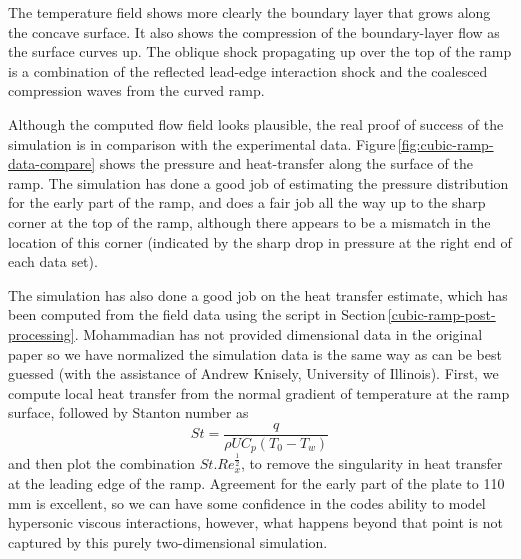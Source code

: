 \medskip
The temperature field shows more clearly the boundary layer that grows along the concave surface.
It also shows the compression of the boundary-layer flow as the surface curves up.
The oblique shock propagating up over the top of the ramp is a combination of the reflected lead-edge
interaction shock and the coalesced compression waves from the curved ramp.

\clearpage

\medskip
Although the computed flow field looks plausible,
the real proof of success of the simulation is in comparison with the experimental data.
Figure\,\ref{fig:cubic-ramp-data-compare} shows the pressure and heat-transfer
along the surface of the ramp.
The simulation has done a good job of estimating the pressure distribution for the early part of the ramp,
and does a fair job all the way up to the sharp corner at the top of the ramp,
although there appears to be a mismatch in the location of this corner 
(indicated by the sharp drop in pressure at the right end of each data set).

\medskip
The simulation has also done a good job on the heat transfer estimate,
which has been computed from the field data using the script in Section\,\ref{cubic-ramp-post-processing}.
Mohammadian has not provided dimensional data in the original paper so we have normalized the simulation
data is the same way as can be best guessed (with the assistance of Andrew Knisely, University of Illinois).
First, we compute local heat transfer from the normal gradient of temperature at the ramp surface,
followed by Stanton number as
$$
St = \frac{q}{\rho U C_p (T_0 - T_w)}
$$
and then plot the combination $St . Re_x^{\frac{1}{2}}$, to remove the singularity in heat transfer
at the leading edge of the ramp.
Agreement for the early part of the plate to 110\,mm is excellent, so we can have some 
confidence in the codes ability to model hypersonic viscous interactions, however,
what happens beyond that point is not captured by this purely two-dimensional simulation.

